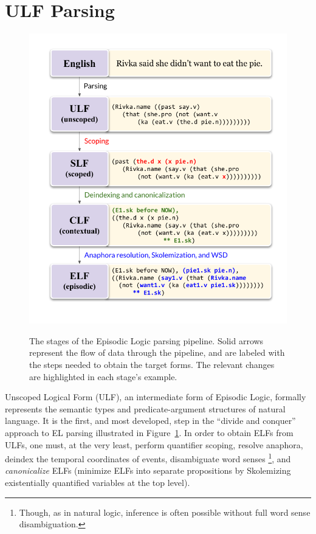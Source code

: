 \section{ULF Parsing}
\label{sec:ulf-parsing}

\begin{figure}
\centering
\includegraphics[width=\columnwidth]{CH2_el/el_pipeline.pdf}
\label{fig:el_pipeline}
\caption{The stages of the Episodic Logic parsing pipeline. Solid arrows represent the flow of data through the pipeline, and are labeled with the steps needed to obtain the target forms. The relevant changes are highlighted in each stage's example.}
\end{figure}

\label{subsec:ulf}
Unscoped Logical Form (ULF), an intermediate form of Episodic Logic, formally represents the semantic types and predicate-argument structures of natural language. It is the first, and most developed, step in the ``divide and conquer'' approach to EL parsing illustrated in Figure~\ref{fig:el_pipeline}. In order to obtain ELFs from ULFs, one must, at the very least, perform quantifier scoping, resolve anaphora, deindex the temporal coordinates of events, disambiguate word senses \footnote{Though, as in natural logic, inference is often possible without full word sense disambiguation.}, and \textit{canonicalize} ELFs (minimize ELFs into separate propositions by Skolemizing existentially quantified variables at the top level).

